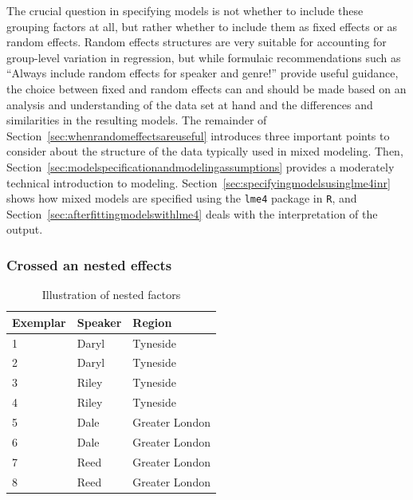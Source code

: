 \documentclass[a4paper,12pt]{article}
\begin{document}
The crucial question in specifying models is not whether to include these grouping factors at all, but rather whether to include them as fixed effects or as random effects.
Random effects structures are very suitable for accounting for group-level variation in regression, but while formulaic recommendations such as ``Always include random effects for speaker and genre!'' provide useful guidance, the choice between fixed and random effects can and should be made based on an analysis and understanding of the data set at hand and the differences and similarities in the resulting models.
The remainder of Section~\ref{sec:whenrandomeffectsareuseful} introduces three important points to consider about the structure of the data typically used in mixed modeling.
Then, Section~\ref{sec:modelspecificationandmodelingassumptions} provides a moderately technical introduction to modeling.
Section~\ref{sec:specifyingmodelsusinglme4inr} shows how mixed models are specified using the \texttt{lme4} package in \texttt{R}, and Section~\ref{sec:afterfittingmodelswithlme4} deals with the interpretation of the output.


\subsubsection{Crossed an nested effects}
\label{sec:crossedandnestedeffects}

\begin{table}
  \centering
  \begin{tabular}{lll}
    \toprule
    \textbf{Exemplar} & \textbf{Speaker}  & \textbf{Region}        \\
    \midrule
                    1 &           Daryl  &         Tyneside       \\
                    2 &           Daryl  &         Tyneside       \\
                    3 &           Riley  &         Tyneside       \\
                    4 &           Riley  &         Tyneside       \\
                    5 &           Dale   &         Greater London \\
                    6 &           Dale   &         Greater London \\
                    7 &           Reed   &         Greater London \\
                    8 &           Reed   &         Greater London \\
    \bottomrule
  \end{tabular}
  \caption{Illustration of nested factors}
  \label{tab:nested}
\end{table}
\end{document}
